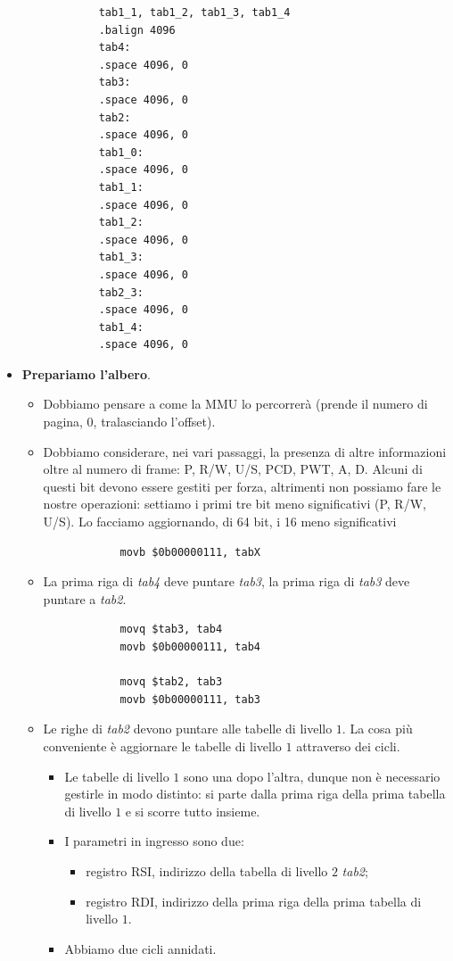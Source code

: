 \begin{itemize}
\begin{multicols}{2}
\begin{verbatim}
			tab1_1, tab1_2, tab1_3, tab1_4
			.balign 4096
			tab4:
			.space 4096, 0
			tab3:
			.space 4096, 0
			tab2:
			.space 4096, 0
			tab1_0:
			.space 4096, 0
			tab1_1:
			.space 4096, 0
			tab1_2:
			.space 4096, 0
			tab1_3:
			.space 4096, 0
			tab2_3:
			.space 4096, 0
			tab1_4:
			.space 4096, 0
		\end{verbatim}
	\end{multicols}
	\item \textbf{Prepariamo l'albero}. 
	\begin{itemize}
		\item Dobbiamo pensare a come la MMU lo percorrerà (prende il numero di pagina, $0$, tralasciando l'offset). 
		\item Dobbiamo considerare, nei vari passaggi, la presenza di altre informazioni oltre al numero di frame: P, R/W, U/S, PCD, PWT, A, D. Alcuni di questi bit devono essere gestiti per forza, altrimenti non possiamo fare le nostre operazioni: settiamo i primi tre bit meno significativi (P, R/W, U/S). Lo facciamo aggiornando, di 64 bit, i 16 meno significativi
		\begin{verbatim}
			movb $0b00000111, tabX
		\end{verbatim}
		\item La prima riga di \emph{tab4} deve puntare \emph{tab3}, la prima riga di \emph{tab3} deve puntare a \emph{tab2}. 
		\begin{verbatim}
			movq $tab3, tab4
			movb $0b00000111, tab4
			
			movq $tab2, tab3
			movb $0b00000111, tab3
		\end{verbatim}
		\item Le righe di \emph{tab2} devono puntare alle tabelle di livello $1$. La cosa più conveniente è aggiornare le tabelle di livello $1$ attraverso dei cicli. 
		\begin{itemize}
			\item Le tabelle di livello $1$ sono una dopo l'altra, dunque non è necessario gestirle in modo distinto: si parte dalla prima riga della prima tabella di livello $1$ e si scorre tutto insieme.
			\item I parametri in ingresso sono due:
			\begin{itemize}
				\item registro RSI, indirizzo della tabella di livello $2$ \emph{tab2};
				\item registro RDI, indirizzo della prima riga della prima tabella di livello $1$.
			\end{itemize}
			\item Abbiamo due cicli annidati.
		\end{itemize}
		

\end{itemize}
\end{itemize}

